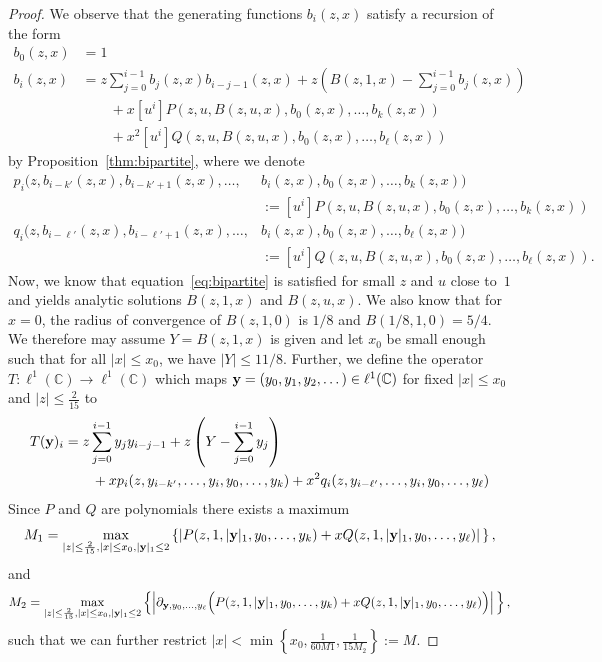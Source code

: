 \documentclass[reqno, 11pt]{amsart}
\theoremstyle{definition}
\theoremstyle{remark}
\newcommand{\C}{\mathbb{C}}
\numberwithin{equation}{section}
\begin{document}
\begin{proof}
	We observe that the generating functions $b_{i}(z,x)$ satisfy a recursion of the form
	\begin{align*}
		b_{0}(z,x) &= 1\\
		b_{i}(z,x) &= z\sum_{j=0}^{i-1}b_{j}(z,x)b_{i-j-1}(z,x)+z(B(z,1,x)-\sum_{j =0}^{i-1}b_{j}(z,x)) \\
        &\qquad +x[u^i] P(z,u,B(z,u,x),b_0(z,x),\dots,b_k(z,x)) \\
        &\qquad + x^2[u^i]Q(z,u,B(z,u,x),b_0(z,x),\dots,b_\ell(z,x))
	\end{align*}
    by Proposition~\ref{thm:bipartite}, where we denote
    \begin{align*}
        p_i(z,b_{i-k'}(z,x), b_{i-k'+1}(z,x),\dots, &b_{i}(z,x),b_0(z,x),\dots,b_k(z,x)) \\
        &:= [u^i] P(z,u,B(z,u,x),b_0(z,x),\dots,b_k(z,x))\\
        q_i(z,b_{i-\ell'}(z,x), b_{i-\ell'+1}(z,x),\dots, &b_{i}(z,x),b_0(z,x),\dots,b_\ell(z,x)) \\
        &:= [u^i] Q(z,u,B(z,u,x),b_0(z,x),\dots,b_\ell(z,x)).
    \end{align*}
    Now, we know that equation~\eqref{eq:bipartite} is satisfied for small $z$ and $u$ close to~$1$ and yields analytic solutions $B(z,1,x)$ and $B(z,u,x)$. We also know that for $x=0$, the radius of convergence of $B(z,1,0)$ is $1/8$ and $B(1/8,1,0)=5/4$. We therefore may assume $Y = B(z,1,x)$ is given and let $x_0$ be small enough such that for all $|x|\leq x_0$, we have $|Y| \leq 11/8$. Further, we define the operator $T: \ell^1 (\C) \rightarrow \ell^1(\C)$ which maps ${\bf y} = (y_0,y_1,y_2, \dots) \in \ell^1(\C)$ for fixed $|x| \leq x_0$ and $|z| \leq \frac{2}{15}$ to
    \begin{align*}
		T({\bf y})_i &= z\sum_{j=0}^{i-1}y_{j}y_{i-j-1}+z\left(Y-\sum_{j =0}^{i-1}y_{j} \right) \\
        &\qquad +xp_i(z,y_{i-k'},\dots, y_i,y_0,\dots,y_k) + x^2q_i(z,y_{i-\ell'},\dots,y_i,y_0,\dots,y_\ell)
	\end{align*}
    Since $P$ and $Q$ are polynomials there exists a maximum
    \[
        M_1 = \max_{|z|\leq \frac{2}{15}, |x|\leq x_0, |{\bf y}|_1\leq 2} \left\{ \left|P(z,1,|{\bf y}|_1,y_0,\dots,y_{k})+xQ(z,1,|{\bf y}|_1,y_0,\dots,y_{\ell})\right|  \,\right\},
    \]
    and
    \[
        M_2 = \max_{|z|\leq \frac{2}{15}, |x|\leq x_0, |{\bf y}|_1\leq 2} \left\{ \Big|\partial_{{\bf y},y_0,\dots,y_{\ell}}\Big(P(z,1,|{\bf y}|_1,y_0,\dots,y_{k})+xQ(z,1,|{\bf y}|_1,y_0,\dots,y_{\ell})\Big)\Big|\, \right\},
    \]
    such that we can further restrict $|x| < \min \left\{x_0,\frac{1}{60M1},\frac{1}{15M_2}\right\} := M$.


\end{proof}
\end{document}
